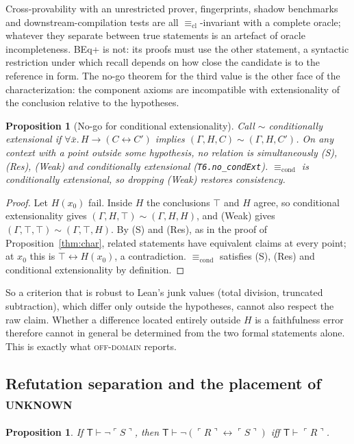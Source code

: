 \documentclass[10pt]{article}
\newtheorem{proposition}[theorem]{Proposition}
\theoremstyle{definition}
\newcommand{\T}{\mathsf{T}}
\newcommand{\Cl}[1]{\ulcorner #1 \urcorner}
\newcommand{\Ecl}{\mathrel{\equiv_{\mathrm{cl}}}}
\newcommand{\Econd}{\mathrel{\equiv_{\mathrm{cond}}}}
\newcommand{\V}[1]{\textsc{#1}}
\begin{document}
Cross-provability with an unrestricted prover, fingerprints, shadow benchmarks and
downstream-compilation tests are all $\Ecl$-invariant with a complete oracle; whatever they
separate between true statements is an artefact of oracle incompleteness. BEq+ is not: its
proofs must use the other statement, a syntactic restriction under which recall depends on how
close the candidate is to the reference in form. The no-go theorem for the third value is the other
face of the characterization: the component axioms are incompatible with extensionality of
the conclusion relative to the hypotheses.

\begin{proposition}[No-go for conditional extensionality]\label{thm:nogo}
Call $\sim$ conditionally extensional if $\forall\bar x.\,H\to(C\leftrightarrow C')$ implies
$(\Gamma,H,C)\sim(\Gamma,H,C')$. On any context with a point outside some hypothesis, no
relation is simultaneously (S), (Res), (Weak) and conditionally extensional
(\texttt{T6.no\_condExt}). $\Econd$ is conditionally extensional, so dropping (Weak) restores
consistency.
\end{proposition}
\begin{proof}
Let $H(x_0)$ fail. Inside $H$ the conclusions $\top$ and $H$ agree, so conditional
extensionality gives $(\Gamma,H,\top)\sim(\Gamma,H,H)$, and (Weak) gives
$(\Gamma,\top,\top)\sim(\Gamma,\top,H)$. By (S) and (Res), as in the proof of
Proposition~\ref{thm:char}, related statements have equivalent claims at every point; at $x_0$
this is $\top\leftrightarrow H(x_0)$, a contradiction. $\Econd$ satisfies (S), (Res) and
conditional extensionality by definition.
\end{proof}

So a criterion that is robust to Lean's junk values (total division, truncated subtraction),
which differ only outside the hypotheses, cannot also respect the raw claim. Whether a difference
located entirely outside $H$ is a faithfulness error therefore cannot in general be determined
from the two formal statements alone. This is exactly what \V{off-domain} reports.

\subsection{Refutation separation and the placement of \V{unknown}}

\begin{proposition}\label{prop:dir}
If $\T\vdash\neg\Cl S$, then $\T\vdash\neg(\Cl R\leftrightarrow\Cl S)$ iff $\T\vdash\Cl R$.
\end{proposition}
\end{document}
